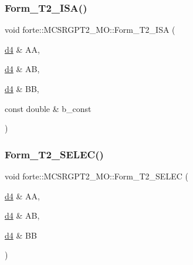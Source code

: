 \mbox{\label{classforte_1_1_m_c_s_r_g_p_t2___m_o_af679c23cc0988a503c06a45caabc9c38}} 
\subsubsection{\texorpdfstring{Form\+\_\+\+T2\+\_\+\+I\+S\+A()}{Form\_T2\_ISA()}}
{\footnotesize\ttfamily void forte\+::\+M\+C\+S\+R\+G\+P\+T2\+\_\+\+M\+O\+::\+Form\+\_\+\+T2\+\_\+\+I\+SA (\begin{DoxyParamCaption}\item[{\mbox{\hyperlink{mcsrgpt2__mo_8h_a0a2245afece5cd37d3b0b6a462927f69}{d4}} \&}]{AA,  }\item[{\mbox{\hyperlink{mcsrgpt2__mo_8h_a0a2245afece5cd37d3b0b6a462927f69}{d4}} \&}]{AB,  }\item[{\mbox{\hyperlink{mcsrgpt2__mo_8h_a0a2245afece5cd37d3b0b6a462927f69}{d4}} \&}]{BB,  }\item[{const double \&}]{b\+\_\+const }\end{DoxyParamCaption})\hspace{0.3cm}{\ttfamily [protected]}}

\mbox{\label{classforte_1_1_m_c_s_r_g_p_t2___m_o_a2f6d8ab15eff1d1a4cef504976268836}} 
\subsubsection{\texorpdfstring{Form\+\_\+\+T2\+\_\+\+S\+E\+L\+E\+C()}{Form\_T2\_SELEC()}}
{\footnotesize\ttfamily void forte\+::\+M\+C\+S\+R\+G\+P\+T2\+\_\+\+M\+O\+::\+Form\+\_\+\+T2\+\_\+\+S\+E\+L\+EC (\begin{DoxyParamCaption}\item[{\mbox{\hyperlink{mcsrgpt2__mo_8h_a0a2245afece5cd37d3b0b6a462927f69}{d4}} \&}]{AA,  }\item[{\mbox{\hyperlink{mcsrgpt2__mo_8h_a0a2245afece5cd37d3b0b6a462927f69}{d4}} \&}]{AB,  }\item[{\mbox{\hyperlink{mcsrgpt2__mo_8h_a0a2245afece5cd37d3b0b6a462927f69}{d4}} \&}]{BB }\end{DoxyParamCaption})\hspace{0.3cm}{\ttfamily [protected]}}

